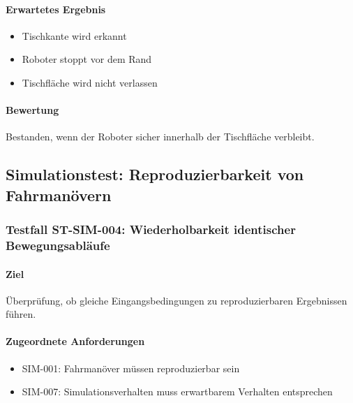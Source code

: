 \documentclass[
  a4paper,
  12pt,
  DIV=12,        %
  parskip=half,  %
  headings=small %
]{scrartcl}
\theoremstyle{definition}
\providecommand{\tightlist}{%
  \setlength{\itemsep}{0pt}\setlength{\parskip}{0pt}}
\theoremstyle{definition}
\begin{document}
\paragraph{Erwartetes Ergebnis}\label{erwartetes-ergebnis-18}

\begin{itemize}
\tightlist
\item
  Tischkante wird erkannt
\item
  Roboter stoppt vor dem Rand
\item
  Tischfläche wird nicht verlassen
\end{itemize}

\paragraph{Bewertung}\label{bewertung-18}

Bestanden, wenn der Roboter sicher innerhalb der Tischfläche verbleibt.

\subsection{Simulationstest: Reproduzierbarkeit von
Fahrmanövern}\label{simulationstest-reproduzierbarkeit-von-fahrmanuxf6vern}

\subsubsection{Testfall ST-SIM-004: Wiederholbarkeit identischer
Bewegungsabläufe}\label{testfall-st-sim-004-wiederholbarkeit-identischer-bewegungsabluxe4ufe}

\paragraph{Ziel}\label{ziel-19}

Überprüfung, ob gleiche Eingangsbedingungen zu reproduzierbaren
Ergebnissen führen.

\paragraph{Zugeordnete
Anforderungen}\label{zugeordnete-anforderungen-19}

\begin{itemize}
\tightlist
\item
  SIM-001: Fahrmanöver müssen reproduzierbar sein
\item
  SIM-007: Simulationsverhalten muss erwartbarem Verhalten entsprechen
\end{itemize}
\end{document}
